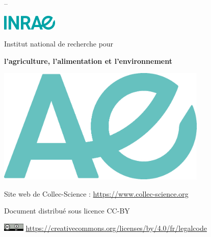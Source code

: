 
\thispagestyle{empty}
\vspace*{4cm}
\textcolor{inrae}{\sffamily\Huge\bfseries\titre}\par
\textcolor{inrae}{\sffamily\Large\bfseries\sousTitre}\par
\textcolor{inrae}{\sffamily\dateVersion{} -- \version}\par

\vspace*{3cm}
\includegraphics{inrae}\par\bigskip
\textcolor{inrae}{\sffamily\Large Institut national de recherche pour}\par
\textcolor{inrae}{\sffamily\Large\bfseries l'agriculture, l'alimentation et l'environnement}\par\bigskip


\vspace*{2cm}
\hspace{-5cm}
{\includegraphics[width=10cm]{sigle-inrae-plein}}

\vspace*{2cm}
   \textcolor{inrae}{\sffamily
   Site web de Collec-Science :
   {\large \href{https://www.collec-science.org}{https://www.collec-science.org} }
   }\par
\vspace*{1cm}
\textcolor{inrae}{\sffamily\auteur}\par

\textcolor{inrae}{\sffamily
Document distribué sous licence CC-BY}\par
  \includegraphics[width=1cm]{cc-by} \href{https://creativecommons.org/licenses/by/4.0/fr/legalcode}{https://creativecommons.org/licenses/by/4.0/fr/legalcode}
\restoregeometry